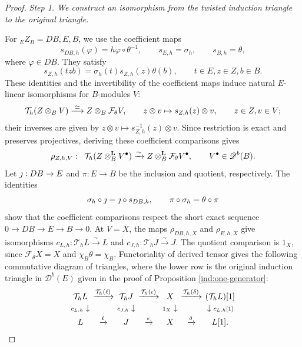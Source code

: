 \documentclass[11pt]{article}
\begin{document}
\begin{proof}
\smallskip
\noindent\emph{Step 1. We construct an isomorphism from the twisted induction triangle to the original triangle.}
\par\nobreak\smallskip\nobreak
\noindent
For ${_E}Z{_B}=DB,E,B$, we use the coefficient maps
\[
 s_{DB,h}(\varphi)=h\varphi\circ\theta^{-1},\qquad
 s_{E,h}=\sigma_h,\qquad s_{B,h}=\theta,
\]
where $\varphi\in DB$. They satisfy
$$s_{Z,h}(tzb)=\sigma_h(t)s_{Z,h}(z)\theta(b),\qquad t\in E, z\in Z, b\in B.$$
These identities and the invertibility of the coefficient maps induce
natural $E$-linear isomorphisms for $B$-modules $V$:
$$\mathcal T_h(Z\otimes_BV)\stackrel{\simeq}{\longrightarrow} Z\otimes_B\mathcal F_\theta V,
\qquad z\otimes v\mapsto s_{Z,h}(z)\otimes v, \qquad z\in Z, v\in V;$$
their inverses are given by $z\otimes v\mapsto s_{Z,h}^{-1}(z)\otimes v$.
Since restriction is exact and preserves projectives, deriving
these coefficient comparisons gives
\[
 \rho_{Z,h,V}:\;\;\mathcal T_h(Z\otimes_B^{\mathbf L}V^{\bullet})
 \xrightarrow{\sim}Z\otimes_B^{\mathbf L}\mathcal F_\theta V^{\bullet},
 \qquad V^{\bullet}\in\mathscr D^b(B).
\]
Let $\mathord{\text{\usefont{OML}{cmm}{m}{it}\symbol{124}}}:DB\to E$ and $\pi:E\to B$ be the inclusion and quotient, respectively.
The identities
\[
 \sigma_h\circ\mathord{\text{\usefont{OML}{cmm}{m}{it}\symbol{124}}}=\mathord{\text{\usefont{OML}{cmm}{m}{it}\symbol{124}}}\circ s_{DB,h},
 \qquad\pi\circ\sigma_h=\theta\circ\pi
\]
show that the coefficient comparisons respect the short exact
sequence $0\to DB\to E\to B\to 0$.
At $V=X$, the maps $\rho_{DB,h,X}$ and $\rho_{E,h,X}$ give isomorphisms
$c_{L,h}:\mathcal T_hL\xrightarrow{\sim}L$ and $c_{J,h}:\mathcal T_hJ\xrightarrow{\sim}J$. The quotient
comparison is $1_X$, since $\mathcal F_\theta X=X$ and $\chi_B\theta=\chi_B$.
Functoriality of derived tensor gives the following commutative diagram of
triangles, where the lower row is the original induction triangle in $\mathscr D^b(E)$
given in the proof of Proposition \ref{ind:one-generator}:
\[
 \begingroup\setlength{\arraycolsep}{2pt}
 \begin{array}{ccccccc}
 \mathcal T_hL&\xrightarrow{\mathcal T_h(\ell)}&\mathcal T_hJ
 &\xrightarrow{\mathcal T_h(\epsilon)}&X
 &\xrightarrow{\mathcal T_h(\delta)}&(\mathcal T_hL)[1]\\[2pt]
 {\scriptstyle c_{L,h}}\downarrow
 &&{\scriptstyle c_{J,h}}\downarrow
 &&{\scriptstyle1_X}\downarrow
 &&\downarrow{\scriptstyle c_{L,h}[1]}\\[2pt]
 L&\xrightarrow{\ell}&J&\xrightarrow{\epsilon}&X
 &\xrightarrow{\delta}&L[1].
 \end{array}
 \endgroup
\]


\end{proof}
\end{document}
